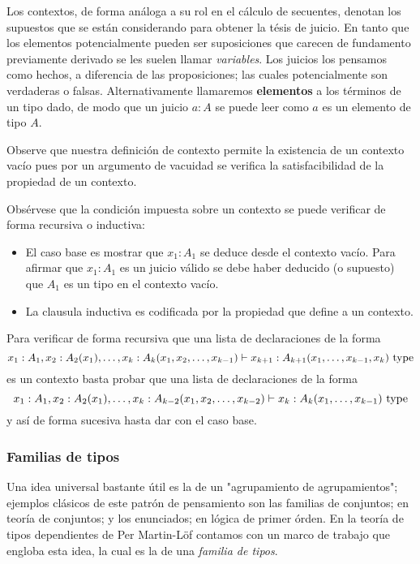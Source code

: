 \documentclass{article}
\begin{document}
        Los contextos, de forma análoga a su rol en el cálculo de secuentes, denotan los supuestos que se están considerando para obtener la tésis de juicio.
        En tanto que los elementos potencialmente pueden ser suposiciones que carecen de fundamento previamente derivado se les suelen llamar \textit{variables}.
        Los juicios los pensamos como hechos, a diferencia de las proposiciones; las cuales potencialmente son verdaderas o falsas.
        Alternativamente llamaremos \textbf{elementos} a los términos de un tipo dado, de modo que un juicio $a : A$ se puede leer como $a$ es un elemento de tipo $A$.
        \begin{remark}
            Observe que nuestra definición de contexto permite la existencia de un contexto vacío pues por un argumento de vacuidad se verifica la
            satisfacibilidad de la propiedad de un contexto.
        \end{remark}
        \begin{remark}
            Obsérvese que la condición impuesta sobre un contexto se puede verificar de forma recursiva o inductiva:
            \begin{itemize}
                \item El caso base es mostrar que $x_1 : A_1$ se deduce desde el contexto vacío. Para afirmar que $x_1 : A_1$ es un juicio válido se debe haber deducido (o supuesto)
                que $A_1$ es un tipo en el contexto vacío.
                \item La clausula inductiva es codificada por la propiedad que define a un contexto.
            \end{itemize}

            Para verificar de forma recursiva que una lista de declaraciones de la forma 
            $$
                x_1 : A_1, x_2 : A_2(x_1), \dots, x_k : A_k(x_1, x_2, \dots, x_{k-1}) \vdash x_{k+1} : A_{k+1}(x_1, \dots, x_{k-1}, x_k)\ \mathrm{type}
            $$
            es un contexto basta probar que una lista de declaraciones de la forma
            $$
            x_1 : A_1, x_2 : A_2(x_1), \dots, x_k : A_{k-2}(x_1, x_2, \dots, x_{k-2}) \vdash x_{k} : A_{k}(x_1, \dots, x_{k-1})\ \mathrm{type}
            $$
            y así de forma sucesiva hasta dar con el caso base.
        \end{remark}
    
    \subsubsection{Familias de tipos}
        Una idea universal bastante útil es la de un "agrupamiento de agrupamientos"; ejemplos clásicos de este patrón de pensamiento son
        las familias de conjuntos; en teoría de conjuntos; y los enunciados; en lógica de primer órden. En la teoría de tipos dependientes
        de Per Martin-Löf contamos con un marco de trabajo que engloba esta idea, la cual es la de una \textit{familia de tipos}.
\end{document}
